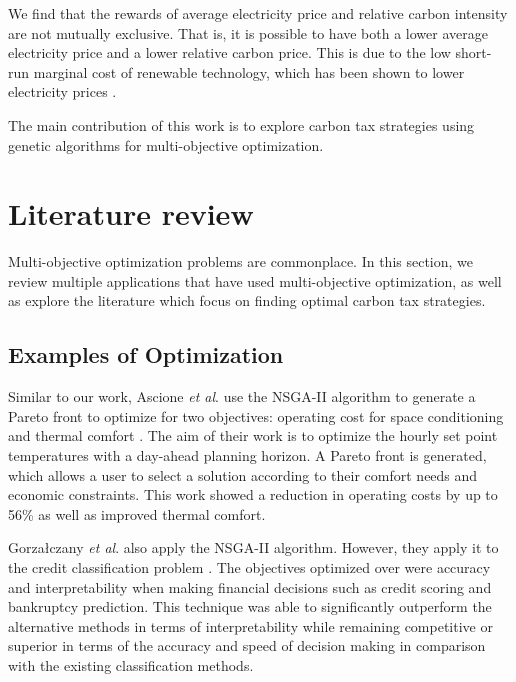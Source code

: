 We find that the rewards of average electricity price and relative carbon intensity are not mutually exclusive. That is, it is possible to have both a lower average electricity price and a lower relative carbon price. This is due to the low short-run marginal cost of renewable technology, which has been shown to lower electricity prices \cite{OMahoney2011}.

The main contribution of this work is to explore carbon tax strategies using genetic algorithms for multi-objective optimization. 











\section{Literature review}
\label{carbonoptim:sec:litreview}

Multi-objective optimization problems are commonplace. In this section, we review multiple applications that have used multi-objective optimization, as well as explore the literature which focus on finding optimal carbon tax strategies.

\subsection{Examples of Optimization}

Similar to our work, Ascione  \textit{et al}. use the NSGA-II algorithm to generate a Pareto front to optimize for two objectives: operating cost for space conditioning and thermal comfort \cite{Ascione2016}. The aim of their work is to optimize the hourly set point temperatures with a day-ahead planning horizon. A Pareto front is generated, which allows a user to select a solution according to their comfort needs and economic constraints. This work showed a reduction in operating costs by up to 56\% as well as improved thermal comfort.

Gorza\l{}czany \textit{et al}. also apply the NSGA-II algorithm. However, they apply it to the credit classification problem \cite{Gorzaczany2016}. The objectives optimized over were accuracy and interpretability when making financial decisions such as credit scoring and bankruptcy prediction. This technique was able to significantly outperform the alternative methods in terms of interpretability while remaining competitive or superior in terms of the accuracy and speed of decision making in comparison with the existing classification methods.

